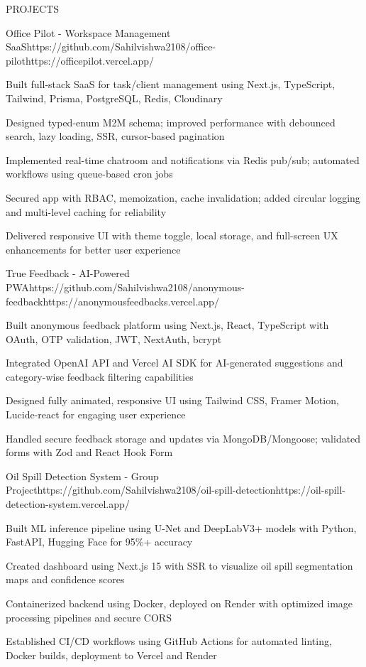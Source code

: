 \documentclass{resume}
\begin{document}
\begin{rSection}{PROJECTS}

\begin{rProject}{Office Pilot - Workspace Management SaaS}{https://github.com/Sahilvishwa2108/office-pilot}{https://officepilot.vercel.app/}
\item Built full-stack SaaS for task/client management using Next.js, TypeScript, Tailwind, Prisma, PostgreSQL, Redis, Cloudinary
\item Designed typed-enum M2M schema; improved performance with debounced search, lazy loading, SSR, cursor-based pagination
\item Implemented real-time chatroom and notifications via Redis pub/sub; automated workflows using queue-based cron jobs
\item Secured app with RBAC, memoization, cache invalidation; added circular logging and multi-level caching for reliability
\item Delivered responsive UI with theme toggle, local storage, and full-screen UX enhancements for better user experience
\end{rProject}

\begin{rProject}{True Feedback - AI-Powered PWA}{https://github.com/Sahilvishwa2108/anonymous-feedback}{https://anonymousfeedbacks.vercel.app/}
\item Built anonymous feedback platform using Next.js, React, TypeScript with OAuth, OTP validation, JWT, NextAuth, bcrypt
\item Integrated OpenAI API and Vercel AI SDK for AI-generated suggestions and category-wise feedback filtering capabilities
\item Designed fully animated, responsive UI using Tailwind CSS, Framer Motion, Lucide-react for engaging user experience
\item Handled secure feedback storage and updates via MongoDB/Mongoose; validated forms with Zod and React Hook Form
\end{rProject}

\begin{rProject}{Oil Spill Detection System - Group Project}{https://github.com/Sahilvishwa2108/oil-spill-detection}{https://oil-spill-detection-system.vercel.app/}
\item Built ML inference pipeline using U-Net and DeepLabV3+ models with Python, FastAPI, Hugging Face for 95\%+ accuracy
\item Created dashboard using Next.js 15 with SSR to visualize oil spill segmentation maps and confidence scores
\item Containerized backend using Docker, deployed on Render with optimized image processing pipelines and secure CORS
\item Established CI/CD workflows using GitHub Actions for automated linting, Docker builds, deployment to Vercel and Render
\end{rProject}

\end{rSection}
\end{document}
